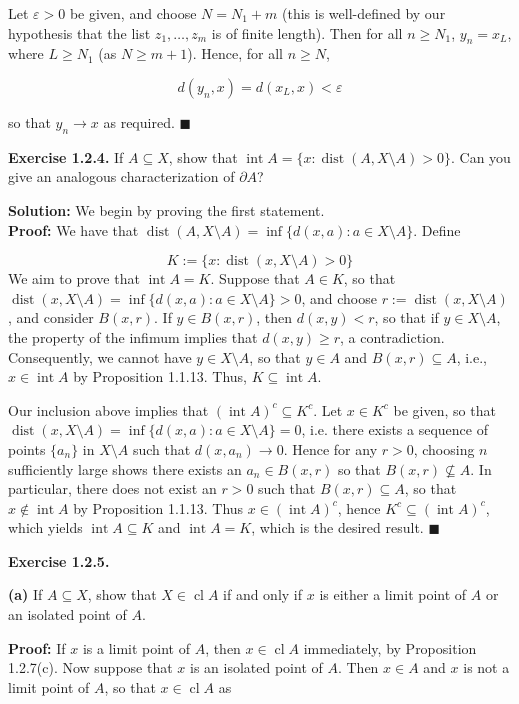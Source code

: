 \documentclass{article}
\DeclareMathOperator{\interior}{int}
\DeclareMathOperator{\dist}{dist}
\DeclareMathOperator{\cl}{cl}
\begin{document}
Let $\varepsilon>0$ be given, and choose $N=N_1+m$ (this is well-defined by our hypothesis that the list $z_1,\dots,z_m$ is of finite length). Then for all $n\geq N_1$, $y_n=x_L$, where $L\geq N_1$ (as $N\geq m+1$). Hence, for all $n\geq N$,

\begin{equation*}
    d(y_n,x)=d(x_L,x)<\varepsilon
\end{equation*}

so that $y_n\to x$ as required. $\blacksquare$
\begin{tcolorbox}
\textbf{Exercise 1.2.4.} If $A\subseteq X$, show that $\interior A=\{x:\dist(A,X\setminus A)>0 \}$. Can you give an analogous characterization of $\partial A$?
\end{tcolorbox}
\textbf{Solution:} We begin by proving the first statement.\\
\textbf{Proof:}  We have that $\dist(A,X\setminus A)=\inf\{d(x,a):a\in X\setminus A\}$. Define 

\begin{equation*}K:=\{x:\dist(x,X\setminus A)>0 \}\end{equation*} We aim to prove that $\interior A=K$. Suppose that $A\in K$, so that $\dist(x,X\setminus A)=\inf\{d(x,a):a\in X\setminus A\}>0$, and choose $r:=\dist(x,X\setminus A)$, and consider $B(x,r)$. If $y\in B(x,r)$, then $d(x,y)<r$, so that if $y\in X\setminus A$, the property of the infimum implies that $d(x,y)\geq r$, a contradiction. Consequently, we cannot have $y\in X\setminus A$, so that $y\in A$ and $B(x,r)\subseteq A$, i.e., $x\in \interior A$ by Proposition 1.1.13. Thus, $K\subseteq \interior A$. 

Our inclusion above implies that $(\interior A)^c\subseteq K^c$. Let $x\in K^c$ be given, so that $\dist(x,X\setminus A)=\inf\{d(x,a):a\in X\setminus A\}=0$, i.e. there exists a sequence of points $\{a_n\}$ in $X\setminus A$ such that $d(x,a_n)\to 0$. Hence for any $r>0$, choosing $n$ sufficiently large shows there exists an $a_n\in B(x,r)$ so that $B(x,r)\nsubseteq A$. In particular, there does not exist an $r>0$ such that $B(x,r)\subseteq A$, so that $x\notin \interior A$ by Proposition 1.1.13. Thus $x\in (\interior A)^c$, hence $K^c\subseteq (\interior A)^c$, which yields $\interior A \subseteq K$ and $\interior A=K$, which is the desired result. $\blacksquare$

\begin{tcolorbox}
\textbf{Exercise 1.2.5.}

\textbf{(a)} If $A\subseteq X$, show that $X\in \cl A$ if and only if $x$ is either a limit point of $A$ or an isolated point of $A$.
\end{tcolorbox}
\textbf{Proof:} If $x$ is a limit point of $A$, then $x\in \cl A$ immediately, by Proposition 1.2.7(c). Now suppose that $x$ is an isolated point of $A$. Then $x\in A$ and $x$ is not a limit point of $A$, so that $x\in \cl A$ as
\end{document}
